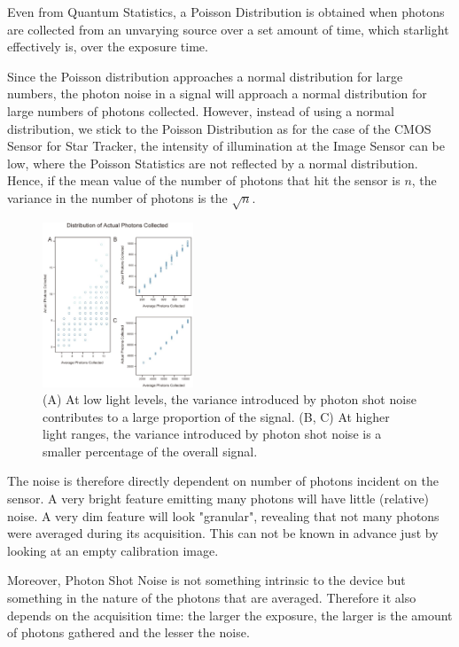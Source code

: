 \documentclass[../../main.tex]{subfiles}
\begin{document}
Even from Quantum Statistics, a Poisson Distribution is obtained when photons are collected from an unvarying source over a set amount of time, which starlight effectively is, over the exposure time. 

Since the Poisson distribution approaches a normal distribution for large numbers, the photon noise in a signal will approach a normal distribution for large numbers of photons collected. However, instead of using a normal distribution, we stick to the Poisson Distribution as for the case of the CMOS Sensor for Star Tracker, the intensity of illumination at the Image Sensor can be low, where the Poisson Statistics are not reflected by a normal distribution. Hence, if the mean value of the number of photons that hit the sensor is $n$, the variance in the number of photons is the $\sqrt{n}$. 

\begin{figure}
  \begin{center}
    \includegraphics[width=0.4\textwidth]{Figures/Model/PSN_Hamamatsu.jpg}
  \end{center}
  \caption{(A) At low light levels, the variance introduced by photon shot noise contributes to a large proportion of the signal. (B, C) At higher light ranges, the variance introduced by photon shot noise is a smaller percentage of the overall signal. \cite{WhatIsPSN?}}
\end{figure}

The noise is therefore directly dependent on number of photons incident on the sensor. A very bright feature emitting many photons will have little (relative) noise. A very dim feature will look "granular", revealing that not many photons were averaged during its acquisition. This can not be known in advance just by looking at an empty calibration image. 

Moreover, Photon Shot Noise is not something intrinsic to the device but something in the nature of the photons that are averaged. Therefore it also depends on the acquisition time: the larger the exposure, the larger is the amount of photons gathered and the lesser the noise.
\end{document}
